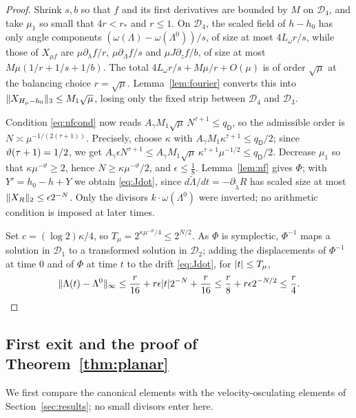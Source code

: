 \begin{proof}
Shrink $s,b$ so that $f$ and its first derivatives are bounded by $M$ on $\mathcal D_4$, and take $\mu_1$ so small that $4r<r_*$ and $r\le1$. On $\mathcal D_4$, the scaled field of $h-h_0$ has only angle components $(\omega(\Lambda)-\omega(\Lambda^0))/s$, of size at most $4L_\omega r/s$, while those of $X_{\mu f}$ are $\mu\partial_\lambda f/r$, $\mu\partial_\Lambda f/s$ and $\mu J\partial_zf/b$, of size at most $M\mu(1/r+1/s+1/b)$. The total $4L_\omega r/s+M\mu/r+O(\mu)$ is of order $\sqrt\mu$ at the balancing choice $r=\sqrt\mu$. Lemma~\ref{lem:fourier} converts this into $\lVert X_{H_\mu-h_0}\rVert_3\le M_1\sqrt\mu$, losing only the fixed strip between $\mathcal D_4$ and $\mathcal D_3$.

Condition \eqref{eq:nfcond} now reads $A_\gamma M_1\sqrt\mu\,N^{\tau+1}\le q_{\mathsf D}$, so the admissible order is $N\asymp\mu^{-1/(2(\tau+1))}$. Precisely, choose $\kappa$ with $A_\gamma M_1\kappa^{\tau+1}\le q_{\mathsf D}/2$; since $\vartheta(\tau+1)=1/2$, we get $A_\gamma\epsilon N^{\tau+1}\le A_\gamma M_1\sqrt\mu\,\kappa^{\tau+1}\mu^{-1/2}\le q_{\mathsf D}/2$. Decrease $\mu_1$ so that $\kappa\mu^{-\vartheta}\ge2$, hence $N\ge\kappa\mu^{-\vartheta}/2$, and $\epsilon\le\tfrac18$. Lemma~\ref{lem:nf} gives $\Phi$; with $Y'=h_0-h+Y$ we obtain \eqref{eq:Jdot}, since $d\tilde\Lambda/dt=-\partial_{\tilde\lambda}R$ has scaled size at most $\lVert X_R\rVert_2\le\epsilon2^{-N}$. Only the divisors $k\cdot\omega(\Lambda^0)$ were inverted; no arithmetic condition is imposed at later times.

Set $c=(\log2)\kappa/4$, so $T_\mu=2^{\kappa\mu^{-\vartheta}/4}\le2^{N/2}$. As $\Phi$ is symplectic, $\Phi^{-1}$ maps a solution in $\mathcal D_1$ to a transformed solution in $\mathcal D_2$; adding the displacements of $\Phi^{-1}$ at time $0$ and of $\Phi$ at time $t$ to the drift \eqref{eq:Jdot}, for $\lvert t\rvert\le T_\mu$,
\[
\lVert \Lambda(t)-\Lambda^0\rVert_\infty\le\frac r{16}+r\epsilon\lvert t\rvert2^{-N}+\frac r{16}\le\frac r8+r\epsilon2^{-N/2}\le\frac r4.
\qedhere
\]
\end{proof}

\subsection{First exit and the proof of Theorem~\ref{thm:planar}}

We first compare the canonical elements with the velocity-osculating elements of Section~\ref{sec:results}; no small divisors enter here.

